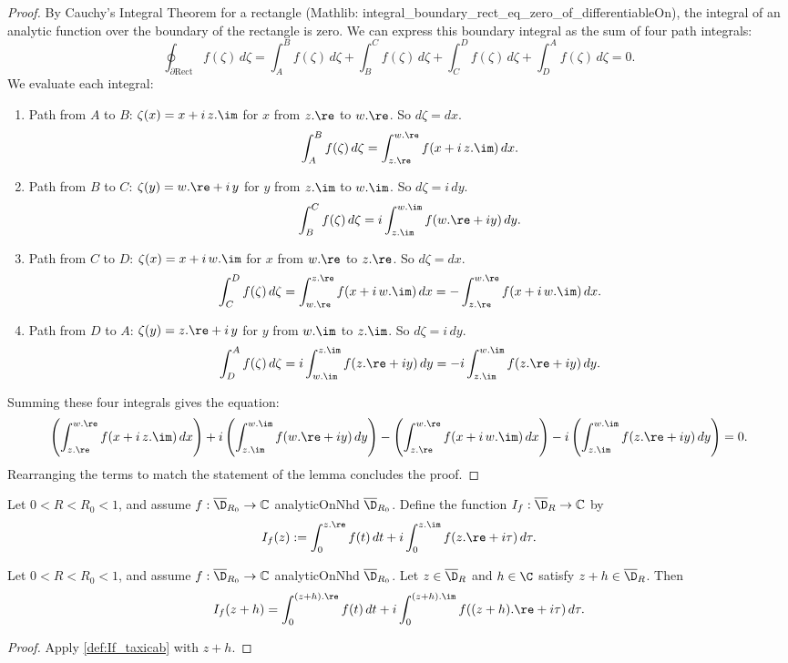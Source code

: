 \begin{proof}
By Cauchy's Integral Theorem for a rectangle (Mathlib: integral\_boundary\_rect\_eq\_zero\_of\_differentiableOn), the integral of an analytic function over the boundary of the rectangle is zero. We can express this boundary integral as the sum of four path integrals:
\[ \oint_{\partial\text{Rect}} f(\zeta)\,d\zeta = \int_A^B f(\zeta)\,d\zeta + \int_B^C f(\zeta)\,d\zeta + \int_C^D f(\zeta)\,d\zeta + \int_D^A f(\zeta)\,d\zeta = 0. \]
We evaluate each integral:
\begin{enumerate}
    \item Path from $A$ to $B$: $\zeta(x) = x + i\,z.\im$ for $x$ from $z.\re$ to $w.\re$. So $d\zeta = dx$.
    \[ \int_A^B f(\zeta)\,d\zeta = \int_{z.\re}^{w.\re} f(x + i\,z.\im) \,dx. \]
    \item Path from $B$ to $C$: $\zeta(y) = w.\re + i\,y$ for $y$ from $z.\im$ to $w.\im$. So $d\zeta = i\,dy$.
    \[ \int_B^C f(\zeta)\,d\zeta = i \int_{z.\im}^{w.\im} f(w.\re + i y) \,dy. \]
    \item Path from $C$ to $D$: $\zeta(x) = x + i\,w.\im$ for $x$ from $w.\re$ to $z.\re$. So $d\zeta = dx$.
    \[ \int_C^D f(\zeta)\,d\zeta = \int_{w.\re}^{z.\re} f(x + i\,w.\im) \,dx = - \int_{z.\re}^{w.\re} f(x + i\,w.\im) \,dx. \]
    \item Path from $D$ to $A$: $\zeta(y) = z.\re + i\,y$ for $y$ from $w.\im$ to $z.\im$. So $d\zeta = i\,dy$.
    \[ \int_D^A f(\zeta)\,d\zeta = i \int_{w.\im}^{z.\im} f(z.\re + i y) \,dy = - i \int_{z.\im}^{w.\im} f(z.\re + i y) \,dy. \]
\end{enumerate}
Summing these four integrals gives the equation:
\[ \left(\int_{z.\re}^{w.\re} f(x + i\,z.\im) \,dx\right) + i \left(\int_{z.\im}^{w.\im} f(w.\re + i y) \,dy\right) - \left(\int_{z.\re}^{w.\re} f(x + i\,w.\im) \,dx\right) - i \left(\int_{z.\im}^{w.\im} f(z.\re + i y) \,dy\right) = 0. \]
Rearranging the terms to match the statement of the lemma concludes the proof.
\end{proof}


\begin{definition} \label{def:If_taxicab}
\leanok
Let $0<R<R_0<1$, and assume $f:\overline{\D}_{R_0}\to\mathbb{C}$ analyticOnNhd $\overline{\D}_{R_0}$. Define the function $I_f:\overline{\D}_R\to\mathbb{C}$ by
\[ I_f(z) := \int_0^{z.\re} f(t)\,dt + i \int_0^{z.\im} f(z.\re + i\tau)\,d\tau. \]
\end{definition}



\begin{lemma} \label{lem:def_If_z_plus_h}
\leanok
Let $0<R<R_0<1$, and assume $f:\overline{\D}_{R_0}\to\mathbb{C}$ analyticOnNhd $\overline{\D}_{R_0}$. Let $z \in \overline{\D}_R$ and $h\in\C$ satisfy $z+h \in \overline{\D}_R$. Then
\[ I_f(z+h) = \int_0^{(z+h).\re} f(t)\,dt + i \int_0^{(z+h).\im} f((z+h).\re + i\tau)\,d\tau. \]
\end{lemma}
\begin{proof} \leanok
{}
Apply \cref{def:If_taxicab} with $z+h$.
\end{proof}

